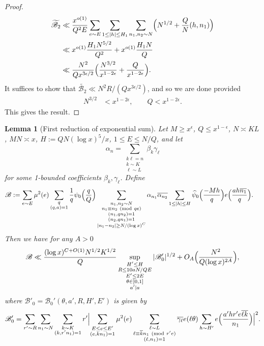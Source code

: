 \documentclass[10pt]{amsart}
\theoremstyle{plain}
\newtheorem{lmm}[thrm]{Lemma}
\numberwithin{equation}{section}
\newcommand{\Mod}[1]{\ (\mathrm{mod}\ #1)}
\renewcommand{\hat}[1]{\widehat #1}
\begin{document}
\begin{proof}
\begin{align*}
\widetilde{\mathscr{B}_2}&\ll  \frac{x^{o(1)} }{Q^2 E}\sum_{e\sim E}\sum_{1\le |h|\le H_1}\sum_{n_1,n_2\sim N} \Bigl(N^{1/2}+\frac{Q}{N}(h,n_1)\Bigr)\\
&\ll x^{o(1)}\frac{H_1 N^{5/2}}{ Q^2}+x^{o(1)}\frac{H_1 N }{Q}\\
&\ll \frac{N^2}{Q x^{3\epsilon/2}}\Bigl(\frac{N^{3/2}}{ x^{1-2\epsilon}}+\frac{Q}{x^{1-2\epsilon} }\Bigr).
\end{align*}
It suffices to show that $\widetilde{\mathscr{B}_2}\ll N^2 R/(Q x^{3\epsilon/2})$, and so we are done provided
\begin{align}
N^{3/2}&< x^{1-2\epsilon},\qquad
Q< x^{1-2\epsilon}.
\end{align}
This gives the result.
\end{proof}
%
%
%
%
%
%
%
%
\begin{lmm}[First reduction of exponential sum]\label{lmm:BFI0}
Let $M\ge x^\epsilon$, $Q\le x^{1-\epsilon}$, $N\asymp KL$, $MN\asymp x$, $H:=Q N (\log{x})^5/x$, $1\le E\le N/Q$, and let
\[
\alpha_{n}=\sum_{\substack{k\ell=n\\ k\sim K\\ \ell\sim L}}\beta_k\gamma_\ell
\]
for some 1-bounded coefficients $\beta_k,\gamma_\ell$.  Define
\begin{align*}
\mathscr{B}&:=\sum_{e\sim E}\mu^2(e)\sum_{\substack{q\\  (q,a)=1}}\frac{1}{q}\psi_0\Bigl(\frac{q}{Q}\Bigr)\sum_{\substack{n_1,n_2\sim N\\ n_1\equiv n_2\Mod{q e}\\ (n_1,q n_2)=1\\ (n_2,q n_1)=1\\ |n_1-n_2|\ge N/(\log{x})^C}}\alpha_{n_1}\overline{\alpha_{n_2}}\sum_{1\le |h|\le H}\hat{\psi_0}\Bigl(\frac{-M h}{q}\Bigr)e\Bigl(\frac{ah\overline{n_1}}{q}\Bigr).
\end{align*}
Then we have for any $A>0$
\[
\mathscr{B}\ll \frac{(\log{x})^{C+O(1)}N^{1/2}K^{1/2} }{Q}\sup_{\substack{H'\le H\\ R\le 10aN/QE\\ E'\le 2E\\ \theta\in[0,1]\\ a'|a}}|\mathscr{B}_0'|^{1/2}+O_{A}\Bigl(\frac{N^2}{Q(\log{x})^{2A}}\Bigr),
\]
where $\mathscr{B}'_0=\mathscr{B}_0'(\theta,a',R,H',E')$ is given by
\[
\mathscr{B}_0'=\sum_{r'\sim R}\sum_{n_1\sim N}\sum_{\substack{k\sim K\\ (k,r' n_1)=1}}r'\Bigl|\sum_{\substack{E\le e\le E'\\ (e,k n_1)=1}}\mu^2(e)\sum_{\substack{\ell\sim L\\ \ell \equiv \overline{k}n_1\Mod{r' e} \\ (\ell,n_1)=1}}\overline{\gamma_\ell}e(\ell\theta)\sum_{ h\sim H'} e\Bigl(\frac{a' h r' e\overline{\ell k}}{n_1}\Bigr)\Bigr|^2.
\]
\end{lmm}
\end{document}
